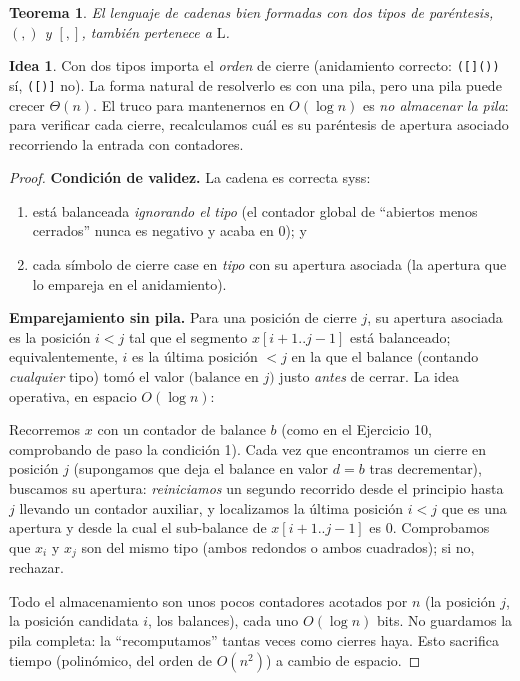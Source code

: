 \documentclass[11pt,a4paper]{article}
\theoremstyle{plain}
\newtheorem{teorema}{Teorema}
\theoremstyle{definition}
\newtheorem*{idea}{Idea}
\newcommand{\Lclass}{\mathrm{L}}
\begin{document}
\begin{teorema}
El lenguaje de cadenas bien formadas con dos tipos de par\'entesis,
$(,)$ y $[,]$, tambi\'en pertenece a $\Lclass$.
\end{teorema}

\begin{idea}
Con dos tipos importa el \emph{orden} de cierre (anidamiento correcto:
\verb|([]())| s\'i, \verb|([)]| no). La forma natural de resolverlo es con una pila,
pero una pila puede crecer $\Theta(n)$. El truco para mantenernos en $O(\log n)$ es
\emph{no almacenar la pila}: para verificar cada cierre, recalculamos cu\'al es su
par\'entesis de apertura asociado recorriendo la entrada con contadores.
\end{idea}

\begin{proof}
\textbf{Condici\'on de validez.} La cadena es correcta syss:
\begin{enumerate}[nosep]
  \item est\'a balanceada \emph{ignorando el tipo} (el contador global de
        ``abiertos menos cerrados'' nunca es negativo y acaba en $0$); y
  \item cada s\'imbolo de cierre case en \emph{tipo} con su apertura asociada
        (la apertura que lo empareja en el anidamiento).
\end{enumerate}

\textbf{Emparejamiento sin pila.} Para una posici\'on de cierre $j$, su apertura
asociada es la posici\'on $i<j$ tal que el segmento $x[i+1..j-1]$ est\'a balanceado;
equivalentemente, $i$ es la \'ultima posici\'on $<j$ en la que el balance (contando
\emph{cualquier} tipo) tom\'o el valor $\big(\text{balance en }j\big)$ justo
\emph{antes} de cerrar. La idea operativa, en espacio $O(\log n)$:

Recorremos $x$ con un contador de balance $b$ (como en el Ejercicio 10, comprobando
de paso la condici\'on 1). Cada vez que encontramos un cierre en posici\'on $j$
(supongamos que deja el balance en valor $d=b$ tras decrementar), buscamos su
apertura: \emph{reiniciamos} un segundo recorrido desde el principio hasta $j$
llevando un contador auxiliar, y localizamos la \'ultima posici\'on $i<j$ que es una
apertura y desde la cual el sub-balance de $x[i+1..j-1]$ es $0$. Comprobamos que
$x_i$ y $x_j$ son del mismo tipo (ambos redondos o ambos cuadrados); si no, rechazar.

Todo el almacenamiento son unos pocos contadores acotados por $n$ (la posici\'on $j$,
la posici\'on candidata $i$, los balances), cada uno $O(\log n)$ bits. No guardamos la
pila completa: la ``recomputamos'' tantas veces como cierres haya. Esto sacrifica
tiempo (polin\'omico, del orden de $O(n^{2})$) a cambio de espacio.


\end{proof}
\end{document}
